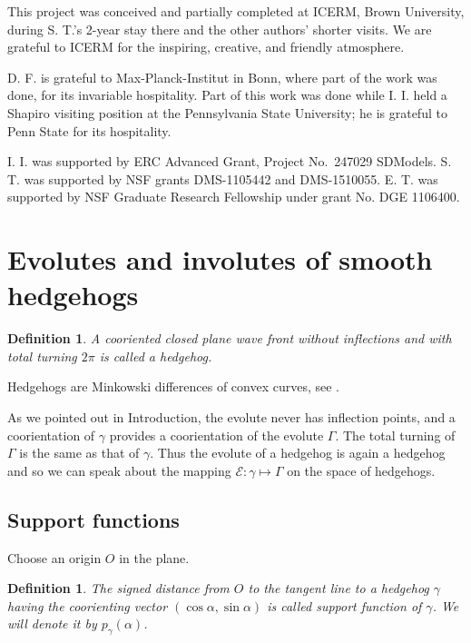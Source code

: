 \documentclass[12pt]{article}
\newtheorem{definition}[lemma]{Definition}
\newcommand{\E}{\mathcal{E}}
\newcommand{\g}{{\gamma}}
\newcommand{\G}{{\Gamma}}
\begin{document}
This project was conceived and partially completed at ICERM, Brown University, during S. T.'s 2-year stay there and the other authors' shorter visits. We are grateful to ICERM for the inspiring, creative, and friendly atmosphere. 

D. F. is grateful to Max-Planck-Institut in Bonn, where part of the work was done, for its invariable hospitality.
Part of this work was done  while I. I.  held a Shapiro visiting position at the Pennsylvania State University; he is grateful to Penn State for its hospitality.  

I. I. was supported by ERC Advanced Grant, Project No.~247029 SDModels. 
S. T. was supported by NSF grants DMS-1105442 and  DMS-1510055.
E. T. was supported by NSF Graduate Research Fellowship under grant No. DGE 1106400. %

\section{Evolutes and involutes of smooth hedgehogs} \label{smooth}

\begin{definition}
\label{hedgehog}
A cooriented closed plane wave front without inflections and with total turning $2\pi$ is called a \emph{hedgehog}.
\end{definition}

Hedgehogs are Minkowski differences of convex curves, see \cite{LLR,MM}. \smallskip

As we pointed out in Introduction, the evolute never has inflection points, and a coorientation of $\g$ provides a coorientation of the evolute $\G$. The total turning of $\G$ is the same as that of $\g$. Thus the evolute of a hedgehog is again a hedgehog and so we can speak about the mapping $\E :\g\mapsto \G$ on the space of hedgehogs. 

\subsection{Support functions} 
\label{smooth-support}

Choose an origin $O$ in the plane.
\begin{definition}
\label{def:support}
The signed distance from $O$ to the tangent line to a hedgehog $\g$ having the coorienting vector $(\cos\alpha,\sin\alpha)$ is called \emph{support function} of $\g$. We will denote it by $p_\g(\alpha)$. 
\end{definition}
\end{document}
